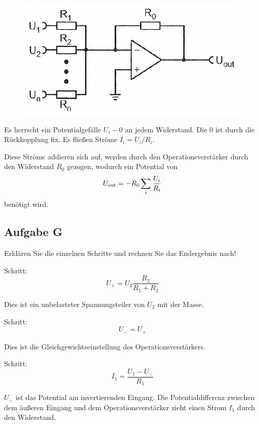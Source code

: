 \begin{figure}[htbp]
	\centering
	\includegraphics[width=.6\linewidth]{Anleitung/5_6-6.png}
	\caption{%
		\cite[Abbildung~5/6.6]{physik313-Anleitung}
	}
	\label{fig:5_6-6}
\end{figure}

Es herrscht ein Potentialgefälle $U_i - 0$ an jedem Widerstand. Die 0 ist
durch die Rückkopplung fix. Es fließen Ströme $I_i = U_i / R_i$.

Diese Ströme addieren sich auf, werden durch den Operationsverstärker durch den
Widerstand $R_0$ gezogen, wodurch ein Potential von
\[
	U_\text{out} = - R_0 \sum_i \frac{U_i}{R_i}
\]
benötigt wird.

\subsection{Aufgabe G}
\label{ssec:Aufgabe_G}

\begin{problem}
	Erklären Sie die einzelnen Schritte und rechnen Sie das Endergebnis nach!
\end{problem}

Schritt:
\begin{equation}
	\label{eq:G1}
	U_+ = U_2 \frac{R_2}{R_1 + R_2}
\end{equation}

Dies ist ein unbelasteter Spannungsteiler von $U_2$ mit der Masse.

Schritt:
\begin{equation}
	\label{eq:G2}
	U_- = U_+
\end{equation}

Dies ist die Gleichgewichtseinstellung des Operationsverstärkers.

Schritt:
\begin{equation}
	\label{eq:G3}
	I_1 = \frac{U_1 - U_-}{R_1}
\end{equation}

$U_-$ ist das Potential am invertierenden Eingang. Die Potentialdifferenz
zwischen dem äußeren Eingang und dem Operationsverstärker zieht einen Strom
$I_1$ durch den Widerstand.

